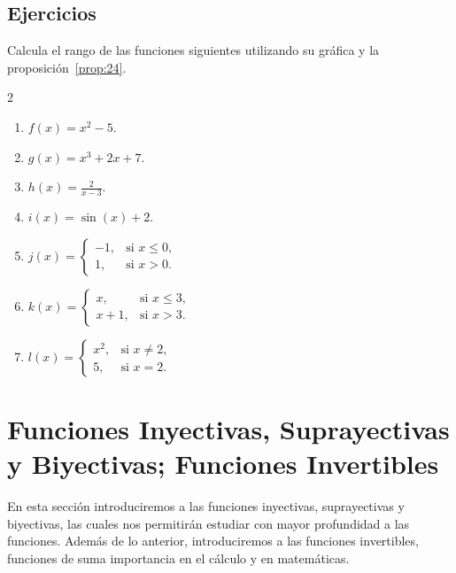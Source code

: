 \documentclass[12pt,a4paper]{book}
\begin{document}
    \par{}\subsection*{Ejercicios}

    \begin{ejercicio}\label{ej:113}
        Calcula el rango de las funciones siguientes utilizando su gráfica
        y la proposición~\ref{prop:24}.
        \begin{multicols}{2}
        \begin{enumerate}[nosep]
            \item $f(x)=x^{2}-5$.
            \item $g(x)=x^{3}+2x+7$.
            \item $h(x)=\frac{2}{x-3}$.
            \item $i(x)=\sin(x)+2$.
            \item $j(x)=\begin{cases}-1, & \text{si }x\leq 0,\\ 1, & \text{si }x>0.\end{cases}$
            \item $k(x)=\begin{cases}x, & \text{si }x\leq 3,\\ x+1, & \text{si }x>3.\end{cases}$
            \item $l(x)=\begin{cases}x^{2}, & \text{si }x\neq 2,\\ 5, & \text{si }x=2.\end{cases}$
        \end{enumerate}
        \end{multicols}
    \end{ejercicio}

    \section{Funciones Inyectivas, Suprayectivas y Biyectivas; Funciones Invertibles}\label{sec:inyectivas}

    En esta sección introduciremos a las funciones inyectivas, suprayectivas y
    biyectivas, las cuales nos permitirán estudiar con mayor profundidad a las
    funciones. Además de lo anterior, introduciremos a las funciones invertibles,
    funciones de suma importancia en el cálculo y en matemáticas.
\end{document}
